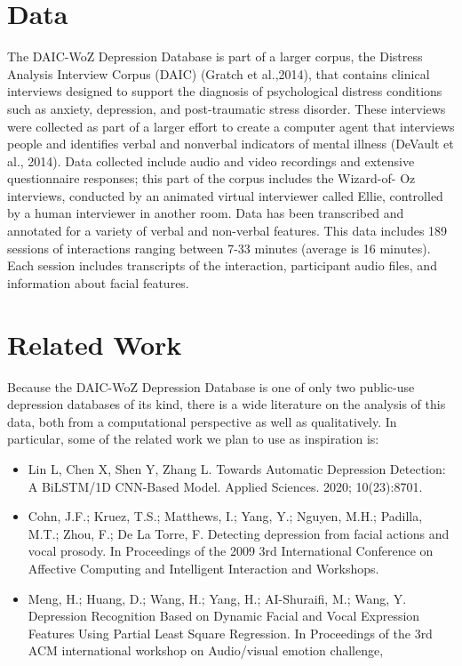 \section{Data}

The DAIC-WoZ Depression Database is part of a larger corpus, the Distress Analysis Interview Corpus (DAIC) (Gratch et al.,2014), that contains clinical interviews designed to support the diagnosis of psychological distress conditions such as anxiety, depression, and post-traumatic stress disorder. These interviews were collected as part of a larger effort to create a computer agent that interviews people and identifies verbal and nonverbal indicators of mental illness (DeVault et al., 2014). Data collected include audio and video recordings and extensive questionnaire responses; this part of the corpus includes the Wizard-of- Oz interviews, conducted by an animated virtual interviewer called Ellie, controlled by a human interviewer in another room. Data has been transcribed and annotated for a variety of verbal and non-verbal features. This data includes 189 sessions of interactions ranging between 7-33 minutes (average is 16 minutes). Each session includes transcripts of the interaction, participant audio files, and information about facial features.



\section{Related Work}

Because the DAIC-WoZ Depression Database is one of only two public-use depression databases of its kind, there is a wide literature on the analysis of this data, both from a computational perspective as well as qualitatively. In particular, some of the related work we plan to use as inspiration is:

\begin{itemize}
    \item Lin L, Chen X, Shen Y, Zhang L. Towards Automatic Depression Detection: A BiLSTM/1D CNN-Based Model. Applied Sciences. 2020; 10(23):8701. 
    \item Cohn, J.F.; Kruez, T.S.; Matthews, I.; Yang, Y.; Nguyen, M.H.; Padilla, M.T.; Zhou, F.; De La Torre, F. Detecting depression from facial actions and vocal prosody. In Proceedings of the 2009 3rd International Conference on Affective Computing and Intelligent Interaction and Workshops.
    \item Meng, H.; Huang, D.; Wang, H.; Yang, H.; AI-Shuraifi, M.; Wang, Y. Depression Recognition Based on Dynamic Facial and Vocal Expression Features Using Partial Least Square Regression. In Proceedings of the 3rd ACM international workshop on Audio/visual emotion challenge, 
\end{itemize}

